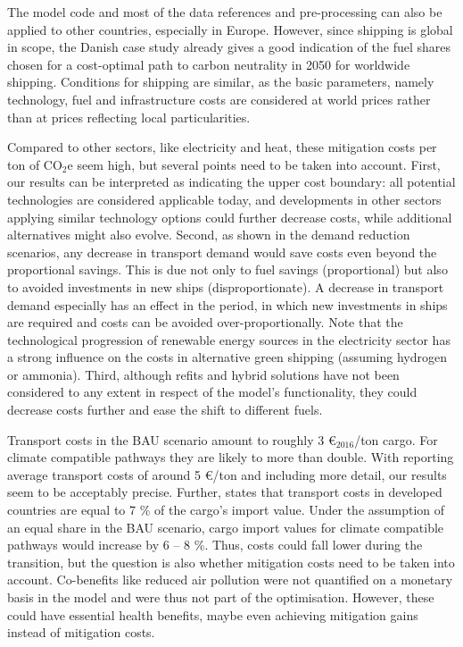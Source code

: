 \documentclass[article]{elsarticle}
\begin{document}
The model code and most of the data references and pre-processing can also be applied to other countries, especially in Europe. However, since shipping is global in scope, the Danish case study already gives a good indication of the fuel shares chosen for a cost-optimal path to carbon neutrality in 2050 for worldwide shipping. Conditions for shipping are similar, as the basic parameters, namely technology, fuel and infrastructure costs are considered at world prices rather than at prices reflecting local particularities. 

Compared to other sectors, like electricity and heat, these mitigation costs per ton of CO$_2$e seem high, but several points need to be taken into account. First, our results can be interpreted as indicating the upper cost boundary: all potential technologies are considered applicable today, and developments in other sectors applying similar technology options could further decrease costs, while additional alternatives might also evolve. Second, as shown in the demand reduction scenarios, any decrease in transport demand would save costs even beyond the proportional savings. This is due not only to fuel savings (proportional) but also to avoided investments in new ships (disproportionate). A decrease in transport demand especially has an effect in the period, in which new investments in ships are required and  costs can be avoided over-proportionally. Note that the technological progression of renewable energy sources in the electricity sector has a strong influence on the costs in alternative green shipping (assuming hydrogen or ammonia). Third, although refits and hybrid solutions have not been considered to any extent in respect of the model's functionality, they could decrease costs further and ease the shift to different fuels.

Transport costs in the BAU scenario amount to roughly 3 \euro$_{2016}$/ton cargo. For climate compatible pathways they are likely to more than double. With \citet[p.~50]{UNCTAD2015} reporting average transport costs of around 5 \euro/ton and including more detail, our results seem to be acceptably precise. Further, \cite[p.~55]{UNCTAD2015} states that transport costs in developed countries are equal to 7 \% of the cargo's import value. Under the assumption of an equal share in the BAU scenario, cargo import values for climate compatible pathways would increase by 6 -- 8 \%.
Thus, costs could fall lower during the transition, but the question is also whether mitigation costs need to be taken into account. Co-benefits like reduced air pollution were not quantified on a monetary basis in the model and were thus not part of the optimisation. However, these could have essential health benefits, maybe even achieving mitigation gains instead of mitigation costs.
\end{document}
